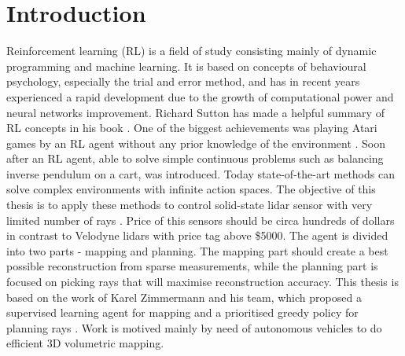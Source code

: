 \section{Introduction}

Reinforcement learning (RL) is a field of study consisting mainly of dynamic programming and machine learning. It is based on concepts of behavioural psychology, especially the trial and error method, and has in recent years experienced a rapid development due to the growth of computational power and neural networks improvement. Richard Sutton has made a helpful summary of RL concepts in his book \cite{sutton2012}. One of the biggest achievements was playing Atari games by an RL agent without any prior knowledge of the environment \cite{mnih2015}. Soon after an RL agent, able to solve simple continuous problems such as balancing inverse pendulum on a cart, was introduced. Today state-of-the-art methods can solve complex environments with infinite action spaces. The objective of this thesis is to apply these methods to control solid-state lidar sensor with very limited number of rays \cite{quanergy2016}. Price of this sensors should be circa hundreds of dollars in contrast to Velodyne lidars with price tag above \$5000. The agent is divided into two parts - mapping and planning. The mapping part should create a best possible reconstruction from sparse measurements, while the planning part is focused on picking rays that will maximise reconstruction accuracy. This thesis is based on the work of Karel Zimmermann and his team, which proposed a supervised learning agent for mapping and a prioritised greedy policy for planning rays \cite{zimmermann2017}. Work is motived mainly by need of autonomous vehicles to do efficient 3D volumetric mapping. 